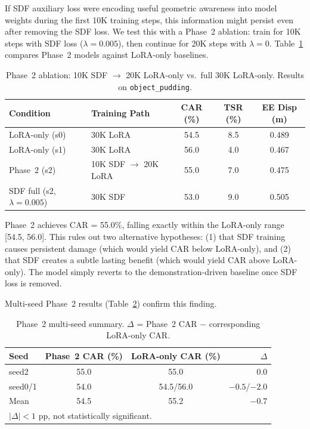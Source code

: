 \documentclass[10pt,letterpaper]{article}
\begin{document}
If SDF auxiliary loss were encoding useful geometric awareness into model weights during the first 10K training steps, this information might persist even after removing the SDF loss. We test this with a Phase~2 ablation: train for 10K steps with SDF loss ($\lambda = 0.005$), then continue for 20K steps with $\lambda = 0$. Table~\ref{tab:phase2} compares Phase~2 models against LoRA-only baselines.

\begin{table}[t]
\centering
\caption{Phase~2 ablation: 10K SDF $\to$ 20K LoRA-only vs.\ full 30K LoRA-only. Results on \texttt{object\_pudding}.}
\label{tab:phase2}
\begin{tabular}{llccc}
\toprule
Condition & Training Path & CAR (\%) & TSR (\%) & EE Disp (m) \\
\midrule
LoRA-only (s0) & 30K LoRA & 54.5 & 8.5 & 0.489 \\
LoRA-only (s1) & 30K LoRA & 56.0 & 4.0 & 0.467 \\
Phase~2 (s2) & 10K SDF $\to$ 20K LoRA & 55.0 & 7.0 & 0.475 \\
SDF full (s2, $\lambda{=}0.005$) & 30K SDF & 53.0 & 9.0 & 0.505 \\
\bottomrule
\end{tabular}
\end{table}

Phase~2 achieves CAR = 55.0\%, falling exactly within the LoRA-only range [54.5, 56.0]. This rules out two alternative hypotheses: (1) that SDF training causes persistent damage (which would yield CAR below LoRA-only), and (2) that SDF creates a subtle lasting benefit (which would yield CAR above LoRA-only). The model simply reverts to the demonstration-driven baseline once SDF loss is removed.

Multi-seed Phase~2 results (Table~\ref{tab:phase2_multi}) confirm this finding.

\begin{table}[t]
\centering
\caption{Phase~2 multi-seed summary. $\Delta$ = Phase~2 CAR $-$ corresponding LoRA-only CAR.}
\label{tab:phase2_multi}
\begin{tabular}{lccr}
\toprule
Seed & Phase~2 CAR (\%) & LoRA-only CAR (\%) & $\Delta$ \\
\midrule
seed2 & 55.0 & 55.0 & 0.0 \\
seed0/1 & 54.0 & 54.5/56.0 & $-0.5$/$-2.0$ \\
\midrule
Mean & 54.5 & 55.2 & $-0.7$ \\
\bottomrule
\multicolumn{4}{l}{\footnotesize $|\Delta| < 1$ pp, not statistically significant.}
\end{tabular}
\end{table}
\end{document}
